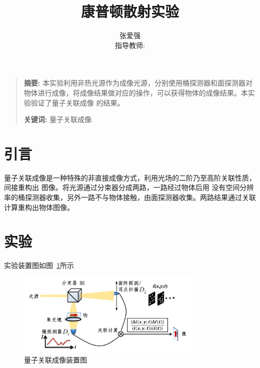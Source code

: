 \documentclass[10pt]{ctexart}
\title{康普顿散射实验}
\author{张爱强\\指导教师: }
\date{}
\newenvironment{sciabstract}{%
\begin{quote} \textbf{摘要: }}
{\end{quote}}
\begin{document}
\maketitle
\begin{sciabstract}
    本实验利用非热光源作为成像光源，分别使用桶探测器和面探测器对物体进行成像，将成像结果做对应的操作，可以获得物体的成像结果。本实验验证了量子关联成像
    的结果。
    \par\textbf{关键词: } 量子关联成像.
\end{sciabstract}
\section{引言}
量子关联成像是一种特殊的非直接成像方式，利用光场的二阶乃至高阶关联性质，间接重构出
图像\cite{pkuWeb}。将光源通过分束器分成两路，一路经过物体后用
没有空间分辨率的桶探测器收集，另外一路不与物体接触，由面探测器收集。两路结果通过关联计算重构出物体图像。
\section{实验}
实验装置图如图~\ref{fig:instrument}所示
\begin{figure}
    \centering
    \includegraphics[width=0.8\textwidth]{data/instrument.png}
    \caption{量子关联成像装置图}
    \label{fig:instrument}
\end{figure}
\end{document}
